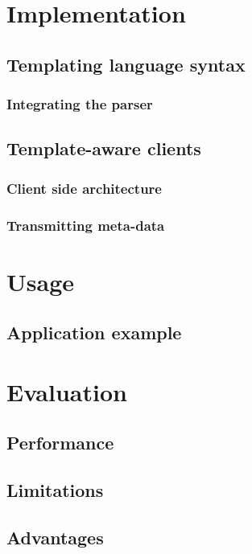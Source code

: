 \documentclass[twoside,11pt,openright]{report}
\begin{document}

\chapter{Implementation}
\section{Templating language syntax}
\subsection{Integrating the parser}
\section{Template-aware clients}
\subsection{Client side architecture}
\subsection{Transmitting meta-data}


\chapter{Usage}
\section{Application example}


\chapter{Evaluation}
\section{Performance}
\section{Limitations}
\section{Advantages}
\end{document}
